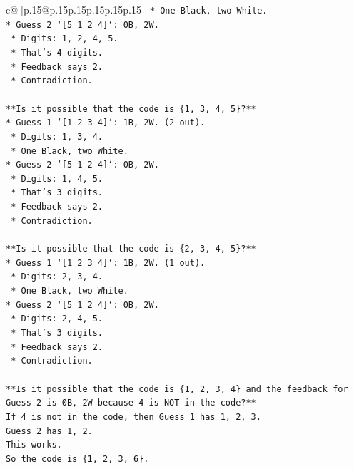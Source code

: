 \documentclass{article}
\begin{document}
{\begin{supertabular}{c@{$\;$}|p{.15\linewidth}@{}p{.15\linewidth}p{.15\linewidth}p{.15\linewidth}p{.15\linewidth}p{.15\linewidth}}
{{{\texttt{    *   One Black, two White.} \\
\texttt{*   Guess 2 `{[}5 1 2 4{]}`: 0B, 2W.} \\
\texttt{    *   Digits: 1, 2, 4, 5.} \\
\texttt{    *   That's 4 digits.} \\
\texttt{    *   Feedback says 2.} \\
\texttt{    *   Contradiction.} \\
\\ 
\texttt{**Is it possible that the code is \{1, 3, 4, 5\}?**} \\
\texttt{*   Guess 1 `{[}1 2 3 4{]}`: 1B, 2W. (2 out).} \\
\texttt{    *   Digits: 1, 3, 4.} \\
\texttt{    *   One Black, two White.} \\
\texttt{*   Guess 2 `{[}5 1 2 4{]}`: 0B, 2W.} \\
\texttt{    *   Digits: 1, 4, 5.} \\
\texttt{    *   That's 3 digits.} \\
\texttt{    *   Feedback says 2.} \\
\texttt{    *   Contradiction.} \\
\\ 
\texttt{**Is it possible that the code is \{2, 3, 4, 5\}?**} \\
\texttt{*   Guess 1 `{[}1 2 3 4{]}`: 1B, 2W. (1 out).} \\
\texttt{    *   Digits: 2, 3, 4.} \\
\texttt{    *   One Black, two White.} \\
\texttt{*   Guess 2 `{[}5 1 2 4{]}`: 0B, 2W.} \\
\texttt{    *   Digits: 2, 4, 5.} \\
\texttt{    *   That's 3 digits.} \\
\texttt{    *   Feedback says 2.} \\
\texttt{    *   Contradiction.} \\
\\ 
\texttt{**Is it possible that the code is \{1, 2, 3, 4\} and the feedback for Guess 2 is 0B, 2W because 4 is NOT in the code?**} \\
\texttt{If 4 is not in the code, then Guess 1 has 1, 2, 3.} \\
\texttt{Guess 2 has 1, 2.} \\
\texttt{This works.} \\
\texttt{So the code is \{1, 2, 3, 6\}.} \\
}}}
\end{supertabular}}
\end{document}
